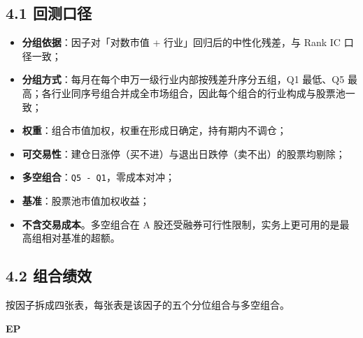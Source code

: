 \documentclass[UTF8,a4paper,11pt]{ctexart}
\begin{document}
{}
\subsection*{4.1 回测口径}

\begin{itemize}[leftmargin=2em,itemsep=2pt,topsep=3pt]
\item 
\textbf{分组依据}：因子对「对数市值 + 行业」回归后的中性化残差，与 Rank IC 口径一致；

\item 
\textbf{分组方式}：每月在每个申万一级行业内部按残差升序分五组，Q1 最低、Q5 最高；各行业同序号组合并成全市场组合，因此每个组合的行业构成与股票池一致；

\item 
\textbf{权重}：组合市值加权，权重在形成日确定，持有期内不调仓；

\item 
\textbf{可交易性}：建仓日涨停（买不进）与退出日跌停（卖不出）的股票均剔除；

\item 
\textbf{多空组合}：\texttt{Q5 - Q1}，零成本对冲；

\item 
\textbf{基准}：股票池市值加权收益；

\item 
\textbf{不含交易成本}。多空组合在 A 股还受融券可行性限制，实务上更可用的是最高组相对基准的超额。

\end{itemize}

{}
\subsection*{4.2 组合绩效}

按因子拆成四张表，每张表是该因子的五个分位组合与多空组合。

\textbf{EP}
\end{document}

